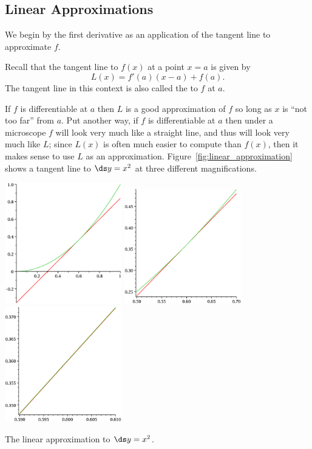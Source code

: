\subsection{Linear Approximations}\label{sec:LinApprox}
We begin by the first derivative as an application of the tangent line to approximate $f$.

Recall that the tangent line to $f(x)$ at a point $x=a$ is given by
\[ L(x) = f'(a) (x-a) + f(a).\]
The tangent line in this context is also called the  to $f$ at $a$.

If $f$ is differentiable at $a$ then $L$ is a good approximation of
$f$ so long as $x$ is ``not too far'' from $a$.  Put another way, if
$f$ is differentiable at $a$ then under a microscope $f$ will look
very much like a straight line, and thus will look very much like $L$;
since $L(x)$ is often much easier to compute than $f(x)$, then it makes sense to use $L$ as an approximation. Figure~\ref{fig:linear_approximation} 
shows a tangent line to $\ds y=x^2$ at three different magnifications. 

\figure[!ht]
\centerline{\includegraphics[width=2in]{images/linear_approx_1}\hfill
\includegraphics[width=2in]{images/linear_approx_2}\hfill
\includegraphics[width=2in]{images/linear_approx_3}\hfill}
\caption{The linear approximation to $\ds y=x^2$. \label{fig:linear_approximation}}
\endfigure

